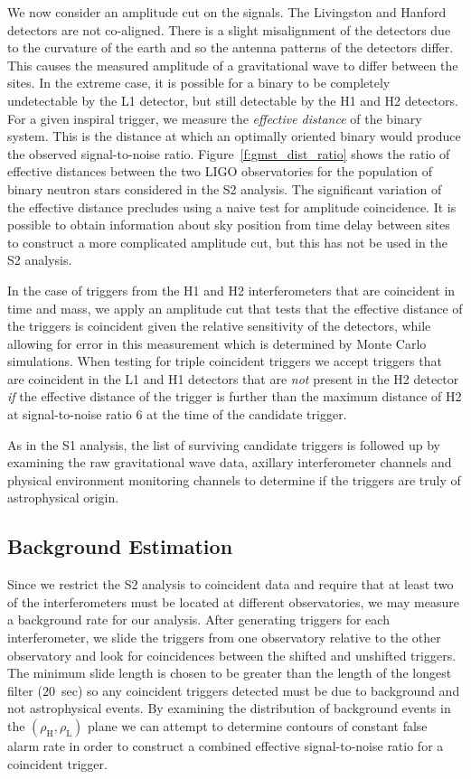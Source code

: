 We now consider an amplitude cut on the signals. The Livingston and Hanford
detectors are not co-aligned. There is a slight misalignment of the detectors
due to the curvature of the earth and so the antenna patterns of the detectors
differ. This causes the measured amplitude of a gravitational wave to differ
between the sites. In the extreme case, it is possible for a binary to be
completely undetectable by the L1 detector, but still detectable by the H1 and
H2 detectors. For a given inspiral trigger, we measure the \emph{effective
distance} of the binary system. This is the distance at which an optimally
oriented binary would produce the observed signal-to-noise ratio.
Figure~\ref{f:gmst_dist_ratio} shows the ratio of effective distances between
the two LIGO observatories for the population of binary neutron stars
considered in the S2 analysis. The significant variation of the effective
distance precludes using a naive test for amplitude coincidence. It is
possible to obtain information about sky position from time delay between
sites to construct a more complicated amplitude cut, but this has not be used
in the S2 analysis.

In the case of triggers from the H1 and H2 interferometers that are coincident
in time and mass, we apply an amplitude cut that tests that the effective
distance of the triggers is coincident given the relative sensitivity of the
detectors, while allowing for error in this measurement which is determined by
Monte Carlo simulations.  When testing for triple coincident triggers we 
accept triggers that are coincident in the L1 and H1 detectors that are
\emph{not} present in the H2 detector \emph{if} the effective distance of the
trigger is further than the maximum distance of H2 at signal-to-noise ratio
$6$ at the time of the candidate trigger.

As in the S1 analysis, the list of surviving candidate triggers is followed up
by examining the raw gravitational wave data, axillary interferometer channels
and physical environment monitoring channels to determine if the triggers are
truly of astrophysical origin.

\subsection{Background Estimation}
\label{ss:background}

Since we restrict the S2 analysis to coincident data and require that at least
two of the interferometers must be located at different observatories, we may
measure a background rate for our analysis. After generating triggers for each
interferometer, we slide the triggers from one observatory relative to the
other observatory and look for coincidences between the shifted and unshifted
triggers. The minimum slide length is chosen to be greater than the length of
the longest filter ($20$~sec) so any coincident triggers detected must be due to background and
not astrophysical events. By examining the distribution of background events
in the $(\rho_\mathrm{H},\rho_\mathrm{L})$ plane we can attempt to determine
contours of constant false alarm rate in order to construct a combined
effective signal-to-noise ratio for a coincident trigger\cite{abbott2004a}.

